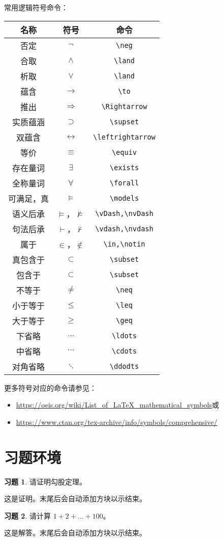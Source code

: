 \documentclass[UTF8,12pt]{article} %
\makeatletter
\theoremstyle{definition}
\newtheorem{exs}{习题}
\newenvironment{proof}[1][\protect\proofname]
{\par
\normalfont\topsep6\p@\@plus6\p@\relax
\trivlist
\itemindent\parindent
\item[\hskip\labelsep\scshape #1]\ignorespaces
}{\endtrivlist\@endpefalse}
\providecommand{\proofname}{Proof}
\renewcommand{\proofname}{\it{证明}}
\makeatother
\begin{document}
常用逻辑符号命令：
\begin{center}
\begin{tabular}{|c|c|c|}
\hline
名称      & 符号                   & 命令 \\
\hline
否定      & $\neg$                & \verb|\neg| \\
合取      & $\land$               & \verb|\land| \\
析取      & $\lor$                & \verb|\land| \\
蕴含      & $\to$                 & \verb|\to| \\
推出      & $\Rightarrow$         & \verb|\Rightarrow| \\
实质蕴涵   & $\supset$             & \verb|\supset| \\
双蕴含     & $\leftrightarrow$     & \verb|\leftrightarrow| \\
等价      & $\equiv$              & \verb|\equiv| \\
存在量词   & $\exists$             & \verb|\exists| \\
全称量词   & $\forall$             & \verb|\forall| \\
可满足，真  & $\models$            & \verb|\models| \\
语义后承   & $\vDash$，$\nvDash$   & \verb|\vDash,\nvDash| \\
句法后承   & $\vdash$，$\nvdash$   & \verb|\vdash,\nvdash| \\
属于      & $\in$，$\notin$       & \verb|\in,\notin| \\
真包含于   & $\subset$             & \verb|\subset| \\
包含于     & $\subset$            & \verb|\subset| \\
不等于     & $\neq$               & \verb|\neq| \\
小于等于   & $\leq$               & \verb|\leq| \\
大于等于   & $\geq$               & \verb|\geq| \\
下省略    & $\ldots$              & \verb|\ldots| \\
中省略    & $\cdots$              & \verb|\cdots| \\
对角省略  & $\ddots$              & \verb|\ddodts| \\
\hline 
\end{tabular}
\end{center}
更多符号对应的命令请参见：
\begin{itemize}
  \item \url{https://oeis.org/wiki/List_of_LaTeX_mathematical_symbols}或
  \item \url{https://www.ctan.org/tex-archive/info/symbols/comprehensive/}
\end{itemize}


\section{习题环境}

\begin{exs}
请证明勾股定理。
\end{exs}
\begin{proof}
这是证明。末尾后会自动添加方块以示结束。
\end{proof}

\begin{exs}
请计算 $1+2+\ldots +100$。
\end{exs}
\begin{proof}[解答]
这是解答。末尾后会自动添加方块以示结束。
\end{proof}
\end{document}
